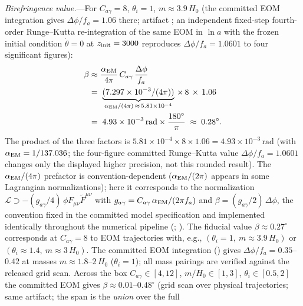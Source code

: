 \documentclass[aps,prd,twocolumn,superscriptaddress,showpacs,preprintnumbers,nofootinbib,longbibliography,floatfix]{revtex4-2}
\begin{document}
\textit{Birefringence value.}---For $C_{a\gamma}=8$, $\theta_i=1$,
$m\approx 3.9\,H_0$ (the committed EOM integration gives
$\Delta\phi/f_a = 1.06$ there; artifact
;
an independent fixed-step fourth-order Runge--Kutta re-integration of the
same EOM in $\ln a$ with the frozen initial condition
$\dot\theta=0$ at $z_{\rm init}=3000$ reproduces
$\Delta\phi/f_a = 1.0601$ to four significant figures):
\begin{equation}
\begin{aligned}
\beta &\approx \frac{\alpha_{\rm EM}}{4\pi}\,C_{a\gamma}\,
\frac{\Delta\phi}{f_a}\\
&=\; \underbrace{(7.297\times 10^{-3}/(4\pi))}_{\alpha_{\rm EM}/(4\pi)\,\approx\,5.81\times 10^{-4}}
\,\times\,8\,\times\, 1.06\\
&=\; 4.93\times 10^{-3}\,\text{rad} \times \frac{180^\circ}{\pi}
\;\approx\; 0.28^\circ.
\end{aligned}
\end{equation}
The product of the three factors is $5.81\times 10^{-4} \times 8 \times
1.06 = 4.93\times 10^{-3}\,\text{rad}$ (with $\alpha_{\rm EM}=1/137.036$;
the four-figure committed Runge--Kutta value $\Delta\phi/f_a=1.0601$
changes only the displayed higher precision, not this rounded result).
The $\alpha_{\rm EM}/(4\pi)$ prefactor is convention-dependent
($\alpha_{\rm EM}/(2\pi)$ appears in some Lagrangian normalizations); here
it corresponds to the normalization
$\mathcal{L} \supset -(g_{a\gamma}/4)\,\phi F_{\mu\nu}\tilde F^{\mu\nu}$
with $g_{a\gamma} = C_{a\gamma}\,\alpha_{\rm EM}/(2\pi f_a)$ and
$\beta = (g_{a\gamma}/2)\,\Delta\phi$, the convention fixed in the
committed model specification and implemented identically throughout the
numerical pipeline
(;
).
The fiducial value $\beta\approx 0.27^\circ$ corresponds at $C_{a\gamma}=8$
to EOM trajectories with, e.g., $(\theta_i=1,\ m\approx 3.9\,H_0)$ or
$(\theta_i\approx 1.4,\ m\approx 3\,H_0)$.
The committed EOM integration ()
gives $\Delta\phi/f_a = 0.35$--$0.42$ at masses $m\approx 1.8$--$2\,H_0$
($\theta_i=1$); all mass pairings are verified against the released grid scan.
Across the box
$C_{a\gamma}\in[4,12]$, $m/H_0\in[1,3]$, $\theta_i\in[0.5,2]$ the committed
EOM gives $\beta\approx 0.01$--$0.48^\circ$ (grid scan over physical
trajectories; same artifact; the span is the \emph{union} over the full
\end{document}
